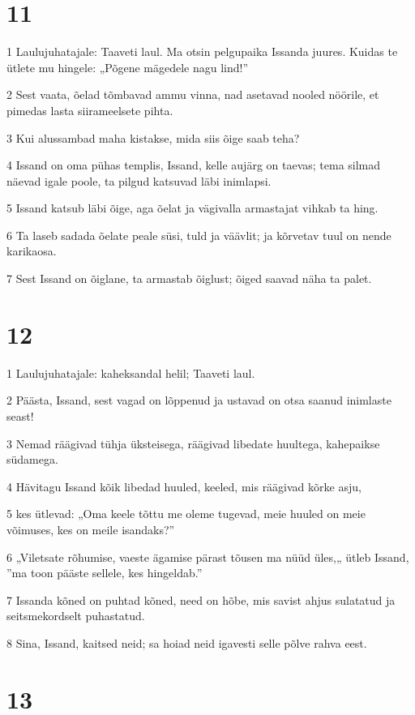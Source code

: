 \chapter{11}

\par 1 Laulujuhatajale: Taaveti laul. Ma otsin pelgupaika Issanda juures. Kuidas te ütlete mu hingele: „Põgene mägedele nagu lind!”
\par 2 Sest vaata, õelad tõmbavad ammu vinna, nad asetavad nooled nöörile, et pimedas lasta siirameelsete pihta.
\par 3 Kui alussambad maha kistakse, mida siis õige saab teha?
\par 4 Issand on oma pühas templis, Issand, kelle aujärg on taevas; tema silmad näevad igale poole, ta pilgud katsuvad läbi inimlapsi.
\par 5 Issand katsub läbi õige, aga õelat ja vägivalla armastajat vihkab ta hing.
\par 6 Ta laseb sadada õelate peale süsi, tuld ja väävlit; ja kõrvetav tuul on nende karikaosa.
\par 7 Sest Issand on õiglane, ta armastab õiglust; õiged saavad näha ta palet.

\chapter{12}

\par 1 Laulujuhatajale: kaheksandal helil; Taaveti laul.
\par 2 Päästa, Issand, sest vagad on lõppenud ja ustavad on otsa saanud inimlaste seast!
\par 3 Nemad räägivad tühja üksteisega, räägivad libedate huultega, kahepaikse südamega.
\par 4 Hävitagu Issand kõik libedad huuled, keeled, mis räägivad kõrke asju,
\par 5 kes ütlevad: „Oma keele tõttu me oleme tugevad, meie huuled on meie võimuses, kes on meile isandaks?”
\par 6 „Viletsate rõhumise, vaeste ägamise pärast tõusen ma nüüd üles,„ ütleb Issand, ”ma toon pääste sellele, kes hingeldab.”
\par 7 Issanda kõned on puhtad kõned, need on hõbe, mis savist ahjus sulatatud ja seitsmekordselt puhastatud.
\par 8 Sina, Issand, kaitsed neid; sa hoiad neid igavesti selle põlve rahva eest.

\chapter{13}

